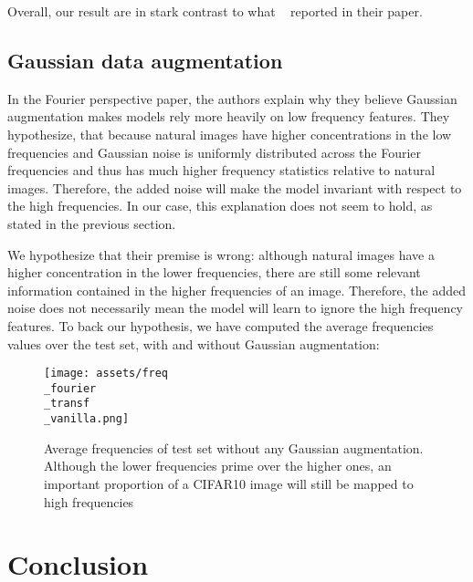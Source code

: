 \documentclass{article} \author{Simon Théorêt}
\begin{document}
Overall, our result are in stark contrast to what
~\citep{yin2020fourier} reported in their paper.

\subsection{Gaussian data augmentation}
In the Fourier perspective paper, the authors explain why they believe
Gaussian augmentation makes models rely more heavily on low frequency
features. They hypothesize, that because natural images have higher
concentrations in the low frequencies and Gaussian noise is uniformly
distributed across the Fourier frequencies and thus has much higher
frequency statistics relative to natural images. Therefore, the added
noise will make the model invariant with respect to the high
frequencies. In our case, this explanation does not seem to hold, as
stated in the previous section.

We hypothesize that their premise is wrong: although natural images
have a higher concentration in the lower frequencies, there are still
some relevant information contained in the higher frequencies of an
image. Therefore, the added noise does not necessarily mean the model
will learn to ignore the high frequency features. To back our
hypothesis, we have computed the average frequencies values over the
test set, with and without Gaussian augmentation:


\begin{figure}[h]
  \centering
  \texttt{[image: assets/freq\\\_fourier\\\_transf\\\_vanilla.png]}
  \caption{Average frequencies of test set without any Gaussian
    augmentation. Although the lower frequencies prime over the higher
    ones, an important proportion of a CIFAR10 image will still be
    mapped to high frequencies}
	\label{fig:fouriervanillafreq}
\end{figure}

\section{Conclusion}
\end{document}
